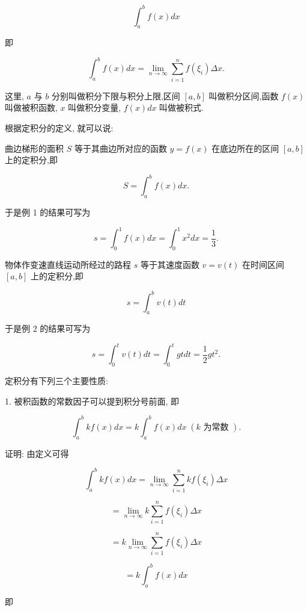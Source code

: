 \documentclass[10pt]{article}
\begin{document}
\[
{\int }_{a}^{b}f\left( x\right) {dx}
\]

即

\[
{\int }_{a}^{b}f\left( x\right) {dx} = \mathop{\lim }\limits_{{n \rightarrow \infty }}\mathop{\sum }\limits_{{i = 1}}^{n}f\left( {\xi }_{i}\right) {\Delta x}.
\]

这里, \(a\) 与 \(b\) 分别叫做积分下限与积分上限,区间 \(\left\lbrack {a,b}\right\rbrack\) 叫做积分区间,函数 \(f\left( x\right)\) 叫做被积函数, \(x\) 叫做积分变量, \(f\left( x\right) {dx}\) 叫做被积式.

根据定积分的定义, 就可以说:

曲边梯形的面积 \(S\) 等于其曲边所对应的函数 \(y = f\left( x\right)\) 在底边所在的区间 \(\left\lbrack {a,b}\right\rbrack\) 上的定积分,即

\[
S = {\int }_{a}^{b}f\left( x\right) {dx}.
\]

于是例 1 的结果可写为

\[
s = {\int }_{0}^{1}f\left( x\right) {dx} = {\int }_{0}^{1}{x}^{2}{dx} = \frac{1}{3}.
\]

物体作变速直线运动所经过的路程 \(s\) 等于其速度函数 \(v = v\left( t\right)\) 在时间区间 \(\left\lbrack {a,b}\right\rbrack\) 上的定积分,即

\[
s = {\int }_{a}^{b}v\left( t\right) {dt}
\]

于是例 2 的结果可写为

\[
s = {\int }_{0}^{t}v\left( t\right) {dt} = {\int }_{0}^{t}{gtdt} = \frac{1}{2}g{t}^{2}.
\]

定积分有下列三个主要性质:

1. 被积函数的常数因子可以提到积分号前面, 即

\[
{\int }_{a}^{b}{kf}\left( x\right) {dx} = k{\int }_{a}^{b}f\left( x\right) {dx}\;\left( {k\text{ 为常数 }}\right) .
\]

证明: 由定义可得

\[
{\int }_{a}^{b}{kf}\left( x\right) {dx} = \mathop{\lim }\limits_{{n \rightarrow \infty }}\mathop{\sum }\limits_{{i = 1}}^{n}{kf}\left( {\xi }_{i}\right) {\Delta x}
\]

\[
= \mathop{\lim }\limits_{{n \rightarrow \infty }}k\mathop{\sum }\limits_{{i = 1}}^{n}f\left( {\xi }_{i}\right) {\Delta x}
\]

\[
= k\mathop{\lim }\limits_{{n \rightarrow \infty }}\mathop{\sum }\limits_{{i = 1}}^{n}f\left( {\xi }_{i}\right) {\Delta x}
\]

\[
= k{\int }_{a}^{b}f\left( x\right) {dx}
\]

即
\end{document}
